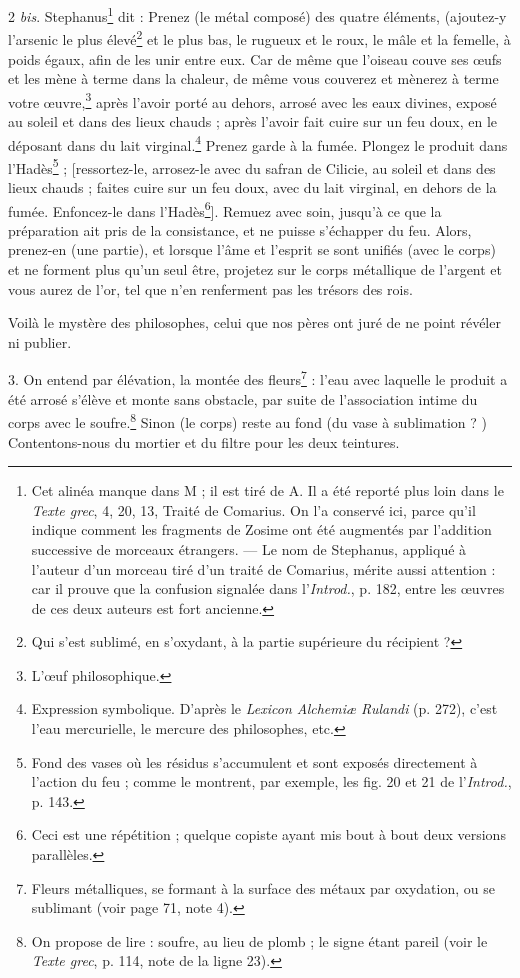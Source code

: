 \documentclass[a4paper, 11pt, oneside, polutonikogreek, french]{article}
\begin{document}
2 \emph{bis}. Stephanus\footnote{Cet alinéa manque dans M ; il est tiré de A. Il a été reporté plus loin dans le \emph{Texte grec}, 4, 20, 13, Traité de Comarius. On l'a conservé ici, parce qu'il indique comment les fragments de Zosime ont été augmentés par l'addition successive de morceaux étrangers. --- Le nom de Stephanus, appliqué à l'auteur d'un morceau tiré d'un traité de Comarius, mérite aussi attention : car il prouve que la confusion signalée dans l'\emph{Introd.}, p. 182, entre les œuvres de ces deux auteurs est fort ancienne.} dit : Prenez (le métal composé) des quatre éléments, (ajoutez-y l'arsenic le plus élevé\footnote{Qui s'est sublimé, en s'oxydant, à la partie supérieure du récipient ?} et le plus bas, le rugueux et le roux, le mâle et la femelle, à poids égaux, afin de les unir entre eux. Car de même que l'oiseau couve ses œufs et les mène à terme dans la chaleur, de même vous couverez et mènerez à terme votre œuvre,\footnote{L'œuf philosophique.} après l'avoir porté au dehors, arrosé avec les eaux divines, exposé au soleil et dans des lieux chauds ; après l'avoir fait cuire sur un feu doux, en le déposant dans du lait virginal.\footnote{Expression symbolique. D'après le \emph{Lexicon Alchemiæ Rulandi} (p. 272), c'est l'eau mercurielle, le mercure des philosophes, etc.} Prenez garde à la fumée. Plongez le produit dans l'Hadès\footnote{Fond des vases où les résidus s'accumulent et sont exposés directement à l'action du feu ; comme le montrent, par exemple, les fig. 20 et 21 de l'\emph{Introd.}, p. 143.} ; [ressortez-le, arrosez-le avec du safran de Cilicie, au soleil et dans des lieux chauds ; faites cuire sur un feu doux, avec du lait virginal, en dehors de la fumée. Enfoncez-le dans l'Hadès\footnote{Ceci est une répétition ; quelque copiste ayant mis bout à bout deux versions parallèles.}]. Remuez avec soin, jusqu'à ce que la préparation ait pris de la consistance, et ne puisse s'échapper du feu. Alors, prenez-en (une partie), et lorsque l'âme et l'esprit se sont unifiés (avec le corps) et ne forment plus qu'un seul être, projetez sur le corps métallique de l'argent et vous aurez de l'or, tel que n'en renferment pas les trésors des rois.

Voilà le mystère des philosophes, celui que nos pères ont juré de ne point révéler ni publier.

3. On entend par élévation, la montée des fleurs\footnote{Fleurs métalliques, se formant à la surface des métaux par oxydation, ou se sublimant (voir page 71, note 4).} : l'eau avec laquelle le produit a été arrosé s'élève et monte sans obstacle, par suite de l'association intime du corps avec le soufre.\footnote{On propose de lire : soufre, au lieu de plomb ; le signe étant pareil (voir le \emph{Texte grec}, p. 114, note de la ligne 23).} Sinon (le corps) reste au fond (du vase à sublimation ? ) Contentons-nous du mortier et du filtre pour les deux teintures.
\end{document}
